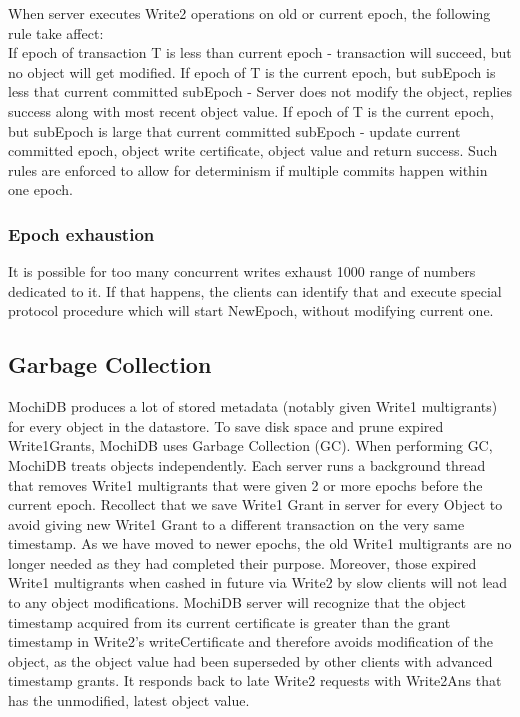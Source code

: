\documentclass[letterpaper,twocolumn,10pt]{article}
\begin{document}
When server executes Write2 operations on old or current epoch, the following rule take affect:\\ If epoch of transaction T is less than current epoch - transaction will succeed, but no object will get modified. If epoch of T is the current epoch, but subEpoch is less that current committed subEpoch - Server does not modify the object, replies success along with most recent object value. If epoch of T is the current epoch, but subEpoch is large that current committed subEpoch - update current committed epoch, object write certificate, object value and return success. Such rules are enforced to allow for determinism if multiple commits happen within one epoch.

\subsubsection{Epoch exhaustion}
It is possible for too many concurrent writes exhaust 1000 range of numbers dedicated to it. If that happens, the clients can identify that and execute special protocol procedure which will start NewEpoch, without modifying current one.

\subsection{Garbage Collection}
MochiDB produces a lot of stored metadata (notably given Write1 multigrants) for every object in the datastore. To save disk space and prune expired Write1Grants, MochiDB uses Garbage Collection (GC). When performing GC, MochiDB treats objects independently. Each server runs a background thread that removes Write1 multigrants that were given 2 or more epochs before the current epoch. Recollect that we save Write1 Grant in server for every Object to avoid giving new Write1 Grant to a different transaction on the very same timestamp. As we have moved to newer epochs, the old Write1 multigrants are no longer needed as they had completed their purpose. Moreover, those expired Write1 multigrants when cashed in future via Write2 by slow clients will not lead to any object modifications. MochiDB server will recognize that the object timestamp acquired from its current certificate is greater than the grant timestamp in Write2's writeCertificate and therefore avoids modification of the object, as the object value had been superseded by other clients with advanced timestamp grants. It responds back to late Write2 requests with Write2Ans that has the unmodified, latest object value.
\end{document}
